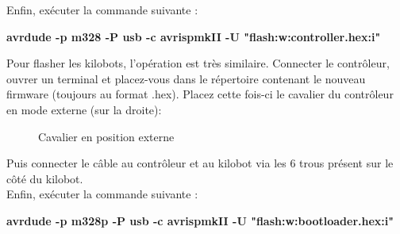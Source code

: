 \documentclass[a4paper,8pt]{report}
\begin{document}
Enfin, ex\'ecuter la commande suivante :\\

\begin{center}
  \textbf{avrdude -p m328  -P usb -c avrispmkII -U "flash:w:controller.hex:i"}
\end{center}

Pour flasher les kilobots, l'op\'eration est tr\`es similaire. Connecter le contr\^oleur, ouvrer un terminal et placez-vous dans le r\'epertoire contenant le nouveau firmware (toujours au format .hex). Placez cette fois-ci le cavalier du contr\^oleur en mode externe (sur la droite): \\

\begin{figure}[!h]
    \centering
    \caption{Cavalier en position externe}
\end{figure}

Puis connecter le c\^able au contr\^oleur et au kilobot via les 6 trous pr\'esent sur le c\^ot\'e du kilobot.\\
Enfin, ex\'ecuter la commande suivante :\\

\begin{center}
  \textbf{avrdude -p m328p -P usb -c avrispmkII -U "flash:w:bootloader.hex:i"}
\end{center}

\smallskip
\begin{center}
\end{center}
\end{document}
